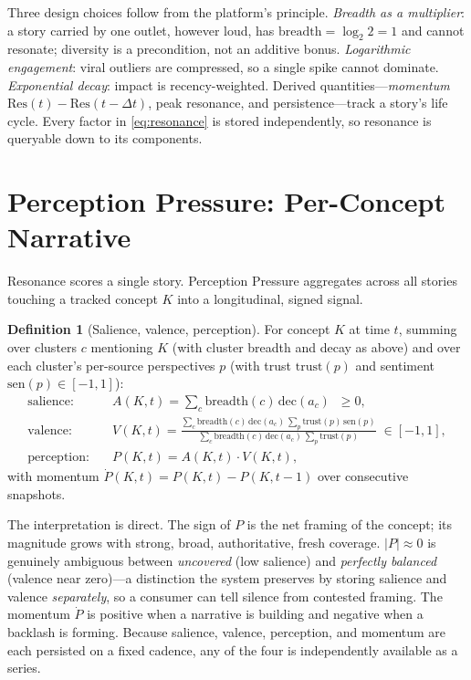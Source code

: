 \documentclass[11pt,a4paper]{article}
\theoremstyle{definition}
\newtheorem{definition}{Definition}[section]
\begin{document}
Three design choices follow from the platform's principle. \emph{Breadth as a multiplier}: a story
carried by one outlet, however loud, has $\mathrm{breadth} = \log_2 2 = 1$ and cannot resonate;
diversity is a precondition, not an additive bonus. \emph{Logarithmic engagement}: viral outliers are
compressed, so a single spike cannot dominate. \emph{Exponential decay}: impact is recency-weighted.
Derived quantities---\emph{momentum} $\mathrm{Res}(t)-\mathrm{Res}(t-\Delta t)$, peak resonance, and
persistence---track a story's life cycle. Every factor in \eqref{eq:resonance} is stored
independently, so resonance is queryable down to its components.

\section{Perception Pressure: Per-Concept Narrative}
\label{sec:perception}

Resonance scores a single story. Perception Pressure aggregates across all stories touching a tracked
concept $K$ into a longitudinal, signed signal.

\begin{definition}[Salience, valence, perception]
\label{def:perception}
For concept $K$ at time $t$, summing over clusters $c$ mentioning $K$ (with cluster breadth and decay
as above) and over each cluster's per-source perspectives $p$ (with trust $\mathrm{trust}(p)$ and
sentiment $\mathrm{sen}(p)\in[-1,1]$):
\begin{align}
  \text{salience:}\quad & A(K,t) = \sum_{c} \mathrm{breadth}(c)\,\mathrm{dec}(a_c) \;\;\ge 0,
    \label{eq:salience}\\[2pt]
  \text{valence:}\quad & V(K,t) =
    \frac{\sum_{c} \mathrm{breadth}(c)\,\mathrm{dec}(a_c)\,\sum_{p}\mathrm{trust}(p)\,\mathrm{sen}(p)}
         {\sum_{c} \mathrm{breadth}(c)\,\mathrm{dec}(a_c)\,\sum_{p}\mathrm{trust}(p)}
    \;\in [-1,1],
    \label{eq:valence}\\[2pt]
  \text{perception:}\quad & P(K,t) = A(K,t)\cdot V(K,t),
    \label{eq:perception}
\end{align}
with momentum $\dot P(K,t) = P(K,t) - P(K,t-1)$ over consecutive snapshots.
\end{definition}

The interpretation is direct. The sign of $P$ is the net framing of the concept; its magnitude grows
with strong, broad, authoritative, fresh coverage. $|P|\approx 0$ is genuinely ambiguous between
\emph{uncovered} (low salience) and \emph{perfectly balanced} (valence near zero)---a distinction the
system preserves by storing salience and valence \emph{separately}, so a consumer can tell silence
from contested framing. The momentum $\dot P$ is positive when a narrative is building and negative
when a backlash is forming. Because salience, valence, perception, and momentum are each persisted on
a fixed cadence, any of the four is independently available as a series.
\end{document}
